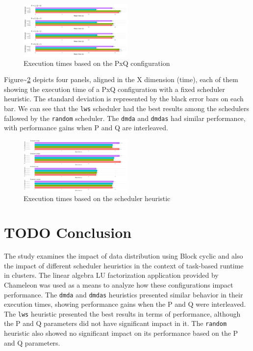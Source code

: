 \documentclass[conference, 10pt, final]{IEEEtran}
\begin{document}
\begin{figure}[ht]
\centering
\includegraphics[width=0.5\textwidth]{tempo_medio_com_desvio_padrao_por_PQ.png}
\caption{Execution times based on the PxQ configuration}
\label{fig:timePQ}
\end{figure}

Figure\textasciitilde{}\ref{fig:timeSched} depicts four panels, aligned in the X dimension (time), each of them showing the execution time of a PxQ configuration with a fixed scheduler heuristic. The standard deviation is represented by the black error bars on each bar. We can see that the \verb|lws| scheduler had the best results among the schedulers fallowed by the \verb|random| scheduler. The \verb|dmda| and \verb|dmdas| had similar performance, with performance gains when P and Q are interleaved.

\begin{figure}[ht]
\centering
\includegraphics[width=0.5\textwidth]{tempo_medio_com_desvio_padrao_por_scheduler.png}
\caption{Execution times based on the scheduler heuristic}
\label{fig:timeSched}
\end{figure}
\section{{\bfseries\sffamily TODO} Conclusion}
\label{sec:conclusion}
The study examines the impact of data distribution using Block cyclic and also the impact of different scheduler heuristics in the context of task-based runtime in clusters. The linear algebra LU factorization application provided by Chameleon was used as a means to analyze how these configurations impact performance. The \verb|dmda| and \verb|dmdas| heuristics presented similar behavior in their execution times, showing performance gains when the P and Q were interleaved. The \verb|lws| heuristic presented the best results in terms of performance, although the P and Q parameters did not have significant impact in it. The \verb|random| heuristic also showed no significant impact on its performance based on the P and Q parameters.
\end{document}
